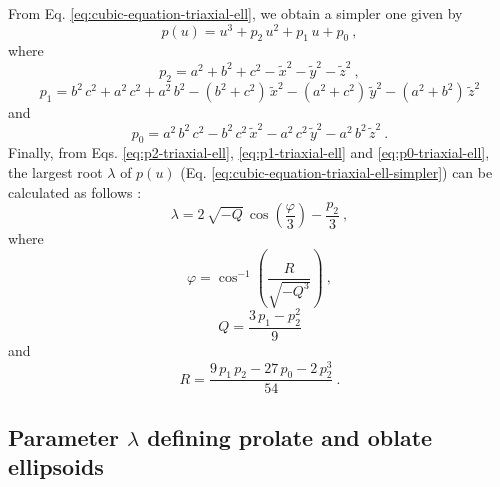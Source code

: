 \documentclass[gmd, manuscript]{copernicus}
\begin{document}
From Eq. \ref{eq:cubic-equation-triaxial-ell}, we obtain a
simpler one given by
\begin{equation}
p(u) =  u^{3} + p_{2} \, u^{2} + p_{1} \, u + p_{0} \: ,
\label{eq:cubic-equation-triaxial-ell-simpler}
\end{equation}
where
\begin{equation}
p_{2} = a^{2} + b^{2} + c^{2} - \tilde{x}^{2} - \tilde{y}^{2} - \tilde{z}^{2} \: ,
\label{eq:p2-triaxial-ell}
\end{equation}
\begin{equation}
p_{1} = b^{2} \, c^{2} + a^{2} \, c^{2} + a^{2} \, b^{2}
- (b^{2} + c^{2}) \, \tilde{x}^{2}
- (a^{2} + c^{2}) \, \tilde{y}^{2}
- (a^{2} + b^{2}) \, \tilde{z}^{2}
\label{eq:p1-triaxial-ell}
\end{equation}
and
\begin{equation}
p_{0} =  a^{2} \, b^{2} \, c^{2} - b^{2} \, c^{2} \,
\tilde{x}^{2} - a^{2} \, c^{2} \, \tilde{y}^{2} - a^{2} \,
b^{2} \, \tilde{z}^{2} \: .
\label{eq:p0-triaxial-ell}
\end{equation}
Finally, from Eqs. \ref{eq:p2-triaxial-ell},
\ref{eq:p1-triaxial-ell} and \ref{eq:p0-triaxial-ell},
the largest root $\lambda$ of $p(u)$
(Eq. \ref{eq:cubic-equation-triaxial-ell-simpler}) can be
calculated as follows \citep{weisstein2017}:
\begin{equation}
\lambda = 2 \, \sqrt{-Q} \, \cos \left( \frac{\varphi}{3}\right) - \frac{p_{2}}{3} \: ,
\label{eq:lambda-triaxial-ell}
\end{equation}
where
\begin{equation}
\varphi = \cos^{-1} \left( \frac{R}{\sqrt{-Q^{3}}} \right) \: ,
\label{eq:varphi-triaxial-ell}
\end{equation}
\begin{equation}
Q = \frac{3 \, p_{1} - p_{2}^{2}}{9}
\label{eq:Q-triaxial-ell}
\end{equation}
and
\begin{equation}
R = \frac{9 \, p_{1} \, p_{2} - 27 \, p_{0} - 2 \, p_{2}^{3}}{54} \: .
\label{eq:R-triaxial-ell}
\end{equation}

\subsection{Parameter $\lambda$ defining prolate and oblate ellipsoids} %
\end{document}
